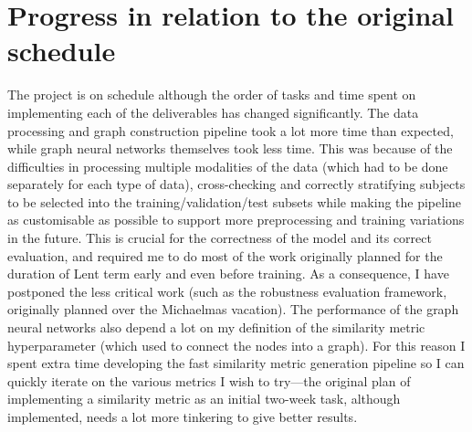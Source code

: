 \documentclass[10pt]{article}
\begin{document}
\section*{Progress in relation to the original schedule}
The project is on schedule although the order of tasks and time spent on implementing each of the deliverables has changed significantly. The data processing and graph construction pipeline took a lot more time than expected, while graph neural networks themselves took less time. This was because of the difficulties in processing multiple modalities of the data (which had to be done separately for each type of data), cross-checking and correctly stratifying subjects to be selected into the training/validation/test subsets while making the pipeline as customisable as possible to support more preprocessing and training variations in the future. This is crucial for the correctness of the model and its correct evaluation, and required me to do most of the work originally planned for the duration of Lent term early and even before training. As a consequence, I have postponed the less critical work (such as the robustness evaluation framework, originally planned over the Michaelmas vacation). The performance of the graph neural networks also depend a lot on my definition of the similarity metric hyperparameter (which used to connect the nodes into a graph). For this reason I spent extra time developing the fast similarity metric generation pipeline so I can quickly iterate on the various metrics I wish to try—the original plan of implementing a similarity metric as an initial two-week task, although implemented, needs a lot more tinkering to give better results.
\end{document}
